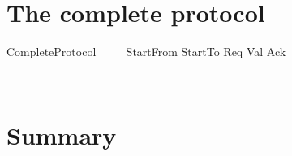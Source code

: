 \section{The complete protocol}

\begin{LSDef}
\begin{zed}
   CompleteProtocol ~~~~ StartFrom \semi StartTo \semi Req \semi Val \semi Ack
\end{zed}~\end{LSDef}

\newpage
\section{Summary}\label{ch5.summary}

\ldefsummary %
\lthmsummary %
\lthmaddeddefsummary %
\lthmaddedthmsummary %
\lzevessummary
